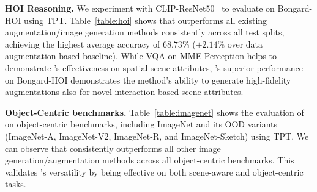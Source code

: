 \textbf{HOI Reasoning.} We experiment with CLIP-ResNet50~\citep{radford2021learning} to evaluate \method on Bongard-HOI using TPT. Table~\ref{table:hoi} shows that \method outperforms all existing augmentation/image generation methods consistently across all test splits, achieving the highest average accuracy of $68.73\%$ ($+2.14\%$ over data augmentation-based baseline). While VQA on MME Perception helps to demonstrate \method's effectiveness on spatial scene attributes, \method's superior performance on Bongard-HOI demonstrates the method's ability to generate high-fidelity augmentations also for novel interaction-based scene attributes.




\textbf{Object-Centric benchmarks.} Table~\ref{table:imagenet} shows the evaluation of \method on object-centric benchmarks, including ImageNet and its OOD variants (ImageNet-A, ImageNet-V2, ImageNet-R, and ImageNet-Sketch) using TPT. We can observe that \method consistently outperforms all other image generation/augmentation methods across all object-centric benchmarks. This validates \method's versatility by being effective on both scene-aware and object-centric tasks.


 

